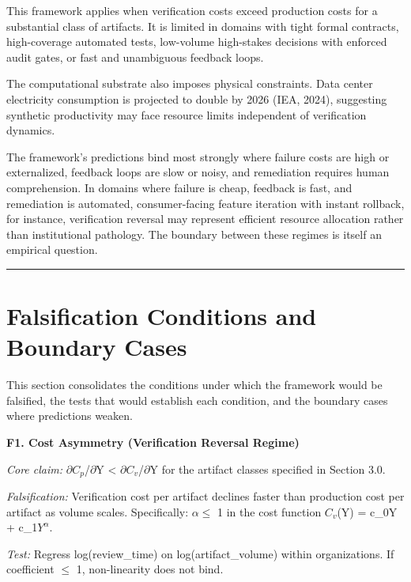 \documentclass[11pt,a4paper]{article}
\begin{document}
This framework applies when verification costs exceed production costs for a substantial class of artifacts. It is limited in domains with tight formal contracts, high-coverage automated tests, low-volume high-stakes decisions with enforced audit gates, or fast and unambiguous feedback loops.

The computational substrate also imposes physical constraints. Data center electricity consumption is projected to double by 2026 (IEA, 2024), suggesting synthetic productivity may face resource limits independent of verification dynamics.

The framework's predictions bind most strongly where failure costs are high or externalized, feedback loops are slow or noisy, and remediation requires human comprehension. In domains where failure is cheap, feedback is fast, and remediation is automated, consumer-facing feature iteration with instant rollback, for instance, verification reversal may represent efficient resource allocation rather than institutional pathology. The boundary between these regimes is itself an empirical question.

\begin{center}\rule{0.5\linewidth}{0.5pt}\end{center}

\hypertarget{falsification-conditions-and-boundary-cases}{%
\section{Falsification Conditions and Boundary Cases}\label{falsification-conditions-and-boundary-cases}}

This section consolidates the conditions under which the framework would be falsified, the tests that would establish each condition, and the boundary cases where predictions weaken.

\textbf{F1. Cost Asymmetry (Verification Reversal Regime)}

\emph{Core claim:} $\partial C_p$/$\partial$Y < $\partial C_v$/$\partial$Y for the artifact classes specified in Section 3.0.

\emph{Falsification:} Verification cost per artifact declines faster than production cost per artifact as volume scales. Specifically: $\alpha \leq$ 1 in the cost function $C_v$(Y) = c\_0Y + c\_1$Y^{\alpha}$.

\emph{Test:} Regress log(review\_time) on log(artifact\_volume) within organizations. If coefficient $\leq$ 1, non-linearity does not bind.
\end{document}
